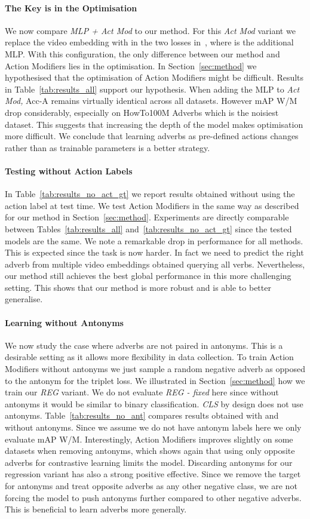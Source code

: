 \documentclass[10pt,twocolumn,letterpaper]{article}
\newcommand{\fparagraph}[1]{\paragraph{#1}}
\begin{document}
\vspace{-15pt}
\fparagraph{The Key is in the Optimisation} We now compare \textit{MLP + Act Mod} to our method.
For this \textit{Act Mod} variant we replace the video embedding  with  in the two losses in~\cite{doughty2020action}, where  is the additional MLP. With this configuration, the only difference between our method and Action Modifiers lies in the optimisation. 
In Section~\ref{sec:method} we hypothesised that the optimisation of Action Modifiers might be difficult. Results in Table~\ref{tab:results_all} support our hypothesis. When adding the MLP to \textit{Act Mod,} Acc-A remains virtually identical across all datasets. However mAP W/M drop considerably, especially on HowTo100M Adverbs which is the noisiest dataset. This suggests that increasing the depth of the model makes optimisation more difficult.
We conclude that learning adverbs as pre-defined actions changes rather than as trainable parameters is a better strategy.

\vspace{-15pt}
\fparagraph{Testing without Action Labels} In Table~\ref{tab:results_no_act_gt} we report results obtained without using the action label at test time. 
We test Action Modifiers in the same way as described for our method in Section~\ref{sec:method}.
Experiments are directly comparable between Tables~\ref{tab:results_all} and~\ref{tab:results_no_act_gt} since the tested models are the same. 
We note a remarkable drop in performance 
for all methods. This is expected since the task is now harder. 
In fact 
we need to predict the right adverb from multiple video embeddings obtained querying all verbs. 
Nevertheless, our method still achieves the best global performance in this more challenging setting. 
This shows that our method is more robust and is able to better generalise. 

\vspace{-15pt}
\fparagraph{Learning without Antonyms} We now study the case where adverbs are not paired in antonyms. This is a desirable setting as it 
allows more flexibility in data collection. To train Action Modifiers without antonyms we just sample a random negative adverb as opposed to the antonym for the triplet loss. 
We illustrated in Section~\ref{sec:method} how we train our \textit{REG} variant.
We do not evaluate \textit{REG - fixed } here since without antonyms it would be similar to binary classification. 
\textit{CLS} 
by design does not use antonyms. 
Table~\ref{tab:results_no_ant} compares results obtained with and without antonyms. Since we assume we do not have antonym labels here we only evaluate mAP W/M.  
Interestingly, Action Modifiers improves slightly on some datasets when removing antonyms, which shows again that 
using only opposite adverbs for contrastive learning limits the model. 
Discarding antonyms for our regression variant has also a strong positive effective. Since we remove the target  for antonyms and treat opposite adverbs as any other negative class, we are not forcing the model to push antonyms further compared to other negative adverbs. This is beneficial to learn adverbs more generally. 
\end{document}

